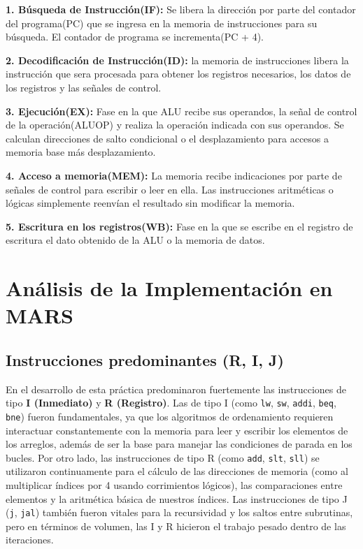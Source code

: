 \documentclass[12pt, a4paper]{article}
\begin{document}
        \textbf{1. Búsqueda de Instrucción(IF):} Se libera la dirección por parte del contador del programa(PC) que se ingresa en la memoria de instrucciones para su búsqueda. El contador de programa se incrementa(PC + 4).

        \textbf{2. Decodificación de Instrucción(ID):} la memoria de instrucciones libera la instrucción que sera procesada para obtener los registros necesarios, los datos de los registros y las señales de control.

        \textbf{3. Ejecución(EX):} Fase en la que ALU recibe sus operandos, la señal de control de la operación(ALUOP) y realiza la operación indicada con sus operandos. Se calculan direcciones de salto condicional o el desplazamiento para accesos a memoria base más desplazamiento.

        \textbf{4. Acceso a memoria(MEM):} La memoria recibe indicaciones por parte de señales de control para escribir o leer en ella. Las instrucciones aritméticas o lógicas simplemente reenvían el resultado sin modificar la memoria.

        \textbf{5. Escritura en los registros(WB):} Fase en la que se escribe en el registro de escritura el dato obtenido de la ALU o la memoria de datos.
    \section{Análisis de la Implementación en MARS}
        
        \subsection{Instrucciones predominantes (R, I, J)}
            En el desarrollo de esta práctica predominaron fuertemente las instrucciones de tipo \textbf{I (Inmediato)} y \textbf{R (Registro)}. Las de tipo I (como \lstinline|lw|, \lstinline|sw|, \lstinline|addi|, \lstinline|beq|, \lstinline|bne|) fueron fundamentales, ya que los algoritmos de ordenamiento requieren interactuar constantemente con la memoria para leer y escribir los elementos de los arreglos, además de ser la base para manejar las condiciones de parada en los bucles. Por otro lado, las instrucciones de tipo R (como \lstinline|add|, \lstinline|slt|, \lstinline|sll|) se utilizaron continuamente para el cálculo de las direcciones de memoria (como al multiplicar índices por 4 usando corrimientos lógicos), las comparaciones entre elementos y la aritmética básica de nuestros índices. Las instrucciones de tipo J (\lstinline|j|, \lstinline|jal|) también fueron vitales para la recursividad y los saltos entre subrutinas, pero en términos de volumen, las I y R hicieron el trabajo pesado dentro de las iteraciones.
\end{document}
